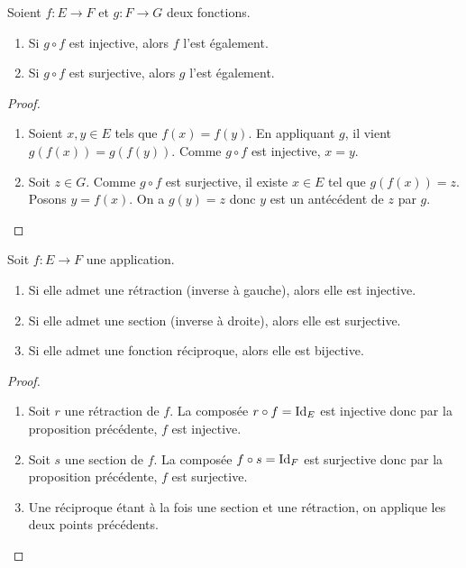 \begin{proposition}
Soient $f : E\to F$ et $g : F\to G$ deux fonctions.
\begin{enumerate}
\item Si $g\circ f$ est injective, alors $f$ l'est également.
\item Si $g\circ f$ est surjective, alors $g$ l'est également.
\end{enumerate}
\end{proposition}
\begin{proof}
\begin{enumerate}
\item Soient $x, y\in E$ tels que $f(x)=f(y)$. En appliquant $g$, il vient $g(f(x))=g(f(y))$. Comme $g\circ f$ est injective, $x=y$.
\item Soit $z\in G$. Comme $g\circ f$ est surjective, il existe $x\in E$ tel que $g(f(x))=z$. Posons $y = f(x)$. On a $g(y)=z$ donc $y$ est un antécédent de $z$ par $g$.
\end{enumerate}
\end{proof}




\begin{corollaire}[de la proposition]\label{bijective-si-reciproque}
Soit $f : E\to F$ une application.
\begin{enumerate}
\item Si elle admet une rétraction (inverse à gauche), alors elle est injective.
\item Si elle admet une section (inverse à droite), alors elle est surjective.
\item Si elle admet une fonction réciproque, alors elle est bijective.
\end{enumerate}
\end{corollaire}
\begin{proof}
\begin{enumerate}
\item Soit $r$ une rétraction de $f$. La composée $r\circ f = \operatorname{Id}_E$ est injective donc par la proposition précédente, $f$ est injective.
\item Soit $s$ une section de $f$. La composée $f \circ s= \operatorname{Id}_F$ est surjective donc par la proposition précédente, $f$ est surjective.
\item Une réciproque étant à la fois une section et une rétraction, on applique les deux points précédents.
\end{enumerate}
\end{proof}


